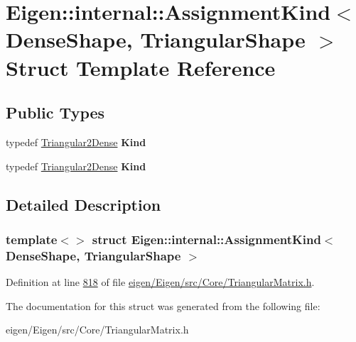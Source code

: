 \hypertarget{struct_eigen_1_1internal_1_1_assignment_kind_3_01_dense_shape_00_01_triangular_shape_01_4}{}\section{Eigen\+:\+:internal\+:\+:Assignment\+Kind$<$ Dense\+Shape, Triangular\+Shape $>$ Struct Template Reference}
\label{struct_eigen_1_1internal_1_1_assignment_kind_3_01_dense_shape_00_01_triangular_shape_01_4}
\subsection*{Public Types}
\begin{DoxyCompactItemize}
\item 
\mbox{\label{struct_eigen_1_1internal_1_1_assignment_kind_3_01_dense_shape_00_01_triangular_shape_01_4_ac48974e888776fdee480c930aade0a63}} 
typedef \hyperlink{struct_eigen_1_1internal_1_1_triangular2_dense}{Triangular2\+Dense} {\bfseries Kind}
\item 
\mbox{\label{struct_eigen_1_1internal_1_1_assignment_kind_3_01_dense_shape_00_01_triangular_shape_01_4_ac48974e888776fdee480c930aade0a63}} 
typedef \hyperlink{struct_eigen_1_1internal_1_1_triangular2_dense}{Triangular2\+Dense} {\bfseries Kind}
\end{DoxyCompactItemize}


\subsection{Detailed Description}
\subsubsection*{template$<$$>$\newline
struct Eigen\+::internal\+::\+Assignment\+Kind$<$ Dense\+Shape, Triangular\+Shape $>$}



Definition at line \hyperlink{eigen_2_eigen_2src_2_core_2_triangular_matrix_8h_source_l00818}{818} of file \hyperlink{eigen_2_eigen_2src_2_core_2_triangular_matrix_8h_source}{eigen/\+Eigen/src/\+Core/\+Triangular\+Matrix.\+h}.



The documentation for this struct was generated from the following file\+:\begin{DoxyCompactItemize}
\item 
eigen/\+Eigen/src/\+Core/\+Triangular\+Matrix.\+h\end{DoxyCompactItemize}

